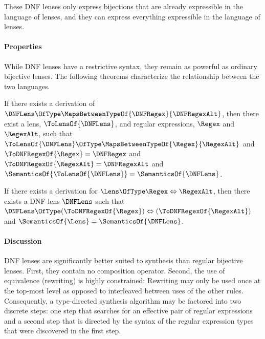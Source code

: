 \documentclass[sigplan,acmsmall]{acmart}
\begin{document}
\iffull
These DNF lenses only express bijections that are already expressible in the
language of lenses, and they can express everything expressible in the
language of lenses.
\fi

\paragraph*{Properties}  While DNF lenses have a restrictive syntax, they
remain as powerful as ordinary bijective lenses.  The following theorems
characterize the relationship between the two languages.

\begin{theorem}
  \label{thm:dnfls}
  If there exists a derivation of $\DNFLens \OfType \MapsBetweenTypeOf{\DNFRegex}{\DNFRegexAlt}$,
  then there exist a lens, $\ToLensOf{\DNFLens}$, and regular expressions, $\Regex$ and 
$\RegexAlt$, such that $\ToLensOf{\DNFLens} \OfType \MapsBetweenTypeOf{\Regex}{\RegexAlt}$ and
  $\ToDNFRegexOf{\Regex}=\DNFRegex$ and
  $\ToDNFRegexOf{\RegexAlt}=\DNFRegexAlt$ and
  $\SemanticsOf{\ToLensOf{\DNFLens}}=\SemanticsOf{\DNFLens}$.
\end{theorem}

\begin{theorem}
  \label{thm:dnflc}
  If there exists a derivation for $\Lens \OfType \Regex \Leftrightarrow
  \RegexAlt$,
  then there exists a DNF lens $\DNFLens$ such that
  $\DNFLens \OfType (\ToDNFRegexOf{\Regex}) \Leftrightarrow (\ToDNFRegexOf{\RegexAlt})$ and $\SemanticsOf{\Lens}=\SemanticsOf{\DNFLens}$.
\end{theorem}

\paragraph*{Discussion} 
DNF lenses are significantly better suited to synthesis than regular
bijective lenses.  First, they contain no composition operator.
Second, the use of equivalence (rewriting) is highly constrained:  Rewriting
may only be used once at the top-most level as opposed to interleaved
between uses of the other rules.  Consequently, a type-directed synthesis
algorithm may be factored into two discrete steps: one step that
searches for an effective pair of regular expressions
and a second step that is directed by the syntax of the regular expression
types that were discovered in the first step.
\end{document}
